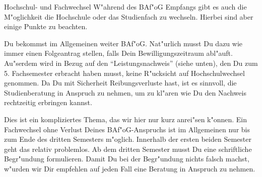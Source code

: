 \begin{artikel}{Hochschul- und Fachwechsel}
W"ahrend des BAf"oG Empfangs gibt es auch die M"oglichkeit die Hochschule oder das Studienfach zu wechseln. Hierbei sind aber einige Punkte zu beachten. 

Du bekommst im Allgemeinen weiter BAf"oG. Nat"urlich musst Du dazu wie immer einen Folgeantrag stellen, falls Dein Bewilligungszeitraum abl"auft. Au"serdem wird in Bezug auf den "`Leistungsnachweis"' (siehe unten), den Du zum 5. Fachsemester erbracht haben musst, keine R"ucksicht auf Hochschulwechsel genommen. Da Du mit Sicherheit Reibungsverluste hast, ist es sinnvoll, die Studienberatung in Anspruch zu nehmen, um zu kl"aren wie Du den Nachweis rechtzeitig erbringen kannst.

Dies ist ein kompliziertes Thema, das wir hier nur kurz anrei"sen k"onnen. Ein Fachwechsel ohne Verlust Deines BAf"oG-Anspruchs ist im Allgemeinen nur bis zum Ende des dritten Semesters m"oglich. Innerhalb der ersten beiden Semester geht das relativ problemlos. Ab dem dritten Semester musst Du eine schriftliche Begr"undung formulieren. Damit Du bei der Begr"undung nichts falsch machst, w"urden wir Dir empfehlen auf jeden Fall eine Beratung in Anspruch zu nehmen.
\end{artikel}

